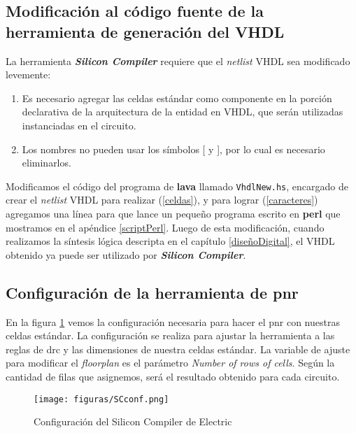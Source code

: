 \subsection{Modificación al código fuente de la herramienta de generación del  VHDL} 

La herramienta \textbf{\emph{Silicon Compiler}} requiere que el \emph{netlist} VHDL sea modificado levemente:
\begin{enumerate}
\item\label{celdas} Es necesario agregar las celdas estándar como componente en la porción declarativa de la arquitectura de la entidad  en VHDL, que serán utilizadas instanciadas en el circuito.
\item\label{caracteres} Los nombres no pueden usar los símbolos [ y ], por lo cual es necesario eliminarlos.
\end{enumerate} 
 
Modificamos el código del programa de \textbf{lava} llamado \verb|VhdlNew.hs|, encargado de crear el \emph{netlist} VHDL para realizar (\ref{celdas}), y para lograr (\ref{caracteres}) agregamos una línea para que lance un pequeño programa escrito en \textbf{perl} que mostramos en el apéndice \ref{scriptPerl}. Luego de esta modificación, cuando realizamos la síntesis lógica descripta en el capítulo \ref{diseñoDigital}, el  VHDL obtenido ya puede ser utilizado por \textbf{\emph{Silicon Compiler}}.



\subsection{Configuración de la herramienta de \gls{pnr}}
En la figura \ref{fig:SCconf} vemos la configuración necesaria para hacer el \gls{pnr} con nuestras celdas estándar. La configuración se realiza para ajustar la herramienta a las reglas de \gls{drc} y las dimensiones de nuestra celdas estándar. La variable de ajuste para modificar el \emph{floorplan} es el parámetro \emph{Number of rows of cells}. Según la cantidad de filas que asignemos, será el resultado obtenido para cada circuito. 


\begin{figure}[h]
\centering
\texttt{[image: figuras/SCconf.png]}
  \caption{Configuración del Silicon Compiler de Electric}
  \label{fig:SCconf}
\end{figure}


